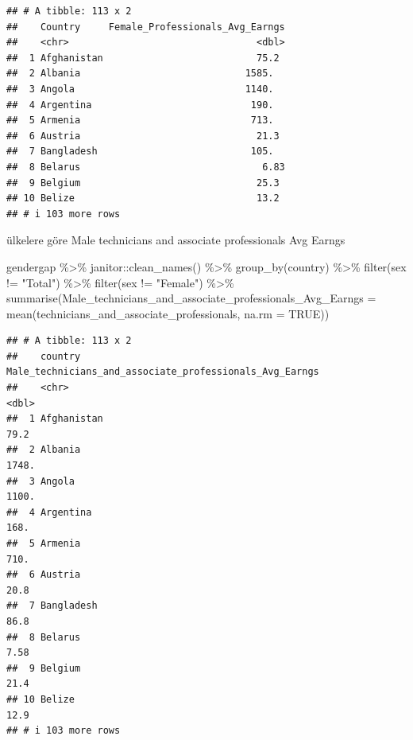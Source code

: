 \documentclass[
]{article}
\newenvironment{Shaded}{\begin{snugshade}}{\end{snugshade}}
\newcommand{\AttributeTok}[1]{\textcolor[rgb]{0.77,0.63,0.00}{#1}}
\newcommand{\ConstantTok}[1]{\textcolor[rgb]{0.00,0.00,0.00}{#1}}
\newcommand{\FunctionTok}[1]{\textcolor[rgb]{0.00,0.00,0.00}{#1}}
\newcommand{\NormalTok}[1]{#1}
\newcommand{\SpecialCharTok}[1]{\textcolor[rgb]{0.00,0.00,0.00}{#1}}
\newcommand{\StringTok}[1]{\textcolor[rgb]{0.31,0.60,0.02}{#1}}
\begin{document}
\begin{verbatim}
## # A tibble: 113 x 2
##    Country     Female_Professionals_Avg_Earngs
##    <chr>                                 <dbl>
##  1 Afghanistan                           75.2 
##  2 Albania                             1585.  
##  3 Angola                              1140.  
##  4 Argentina                            190.  
##  5 Armenia                              713.  
##  6 Austria                               21.3 
##  7 Bangladesh                           105.  
##  8 Belarus                                6.83
##  9 Belgium                               25.3 
## 10 Belize                                13.2 
## # i 103 more rows
\end{verbatim}

ülkelere göre Male technicians and associate professionals Avg Earngs

\begin{Shaded}
\begin{Highlighting}[]
\NormalTok{gendergap }\SpecialCharTok{\%\textgreater{}\%}
\NormalTok{  janitor}\SpecialCharTok{::}\FunctionTok{clean\_names}\NormalTok{() }\SpecialCharTok{\%\textgreater{}\%}
  \FunctionTok{group\_by}\NormalTok{(country) }\SpecialCharTok{\%\textgreater{}\%} 
  \FunctionTok{filter}\NormalTok{(sex }\SpecialCharTok{!=} \StringTok{"Total"}\NormalTok{) }\SpecialCharTok{\%\textgreater{}\%}
  \FunctionTok{filter}\NormalTok{(sex }\SpecialCharTok{!=} \StringTok{"Female"}\NormalTok{) }\SpecialCharTok{\%\textgreater{}\%}
  \FunctionTok{summarise}\NormalTok{(}\AttributeTok{Male\_technicians\_and\_associate\_professionals\_Avg\_Earngs =} \FunctionTok{mean}\NormalTok{(technicians\_and\_associate\_professionals, }\AttributeTok{na.rm =} \ConstantTok{TRUE}\NormalTok{))}
\end{Highlighting}
\end{Shaded}

\begin{verbatim}
## # A tibble: 113 x 2
##    country     Male_technicians_and_associate_professionals_Avg_Earngs
##    <chr>                                                         <dbl>
##  1 Afghanistan                                                   79.2 
##  2 Albania                                                     1748.  
##  3 Angola                                                      1100.  
##  4 Argentina                                                    168.  
##  5 Armenia                                                      710.  
##  6 Austria                                                       20.8 
##  7 Bangladesh                                                    86.8 
##  8 Belarus                                                        7.58
##  9 Belgium                                                       21.4 
## 10 Belize                                                        12.9 
## # i 103 more rows
\end{verbatim}
\end{document}
